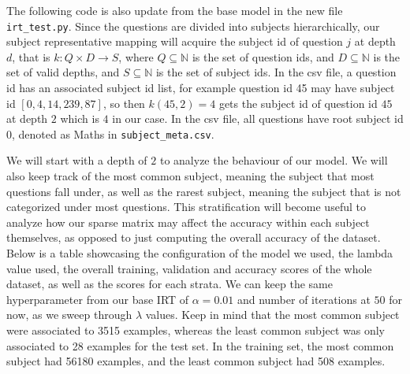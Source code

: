 \documentclass[11pt]{article}
\begin{document}
The following code is also update from the base model in the new file \verb|irt_test.py|. Since the questions are divided into subjects hierarchically, our subject representative mapping will acquire the subject id of question $j$ at depth $d$, that is $k:Q \times D \to S$, where $Q \subseteq \mathbb{N}$ is the set of question ids, and $D \subseteq \mathbb{N}$ is the set of valid depths, and $S \subseteq \mathbb{N}$ is the set of subject ids. In the csv file, a question id has an associated subject id list, for example question id 45 may have subject id $[0, 4, 14, 239, 87]$, so then $k(45, 2) = 4$ gets the subject id of question id $45$ at depth $2$ which is $4$ in our case. In the csv file, all questions have root subject id $0$, denoted as Maths in \verb|subject_meta.csv|. 

We will start with a depth of $2$ to analyze the behaviour of our model. We will also keep track of the most common subject, meaning the subject that most questions fall under, as well as the rarest subject, meaning the subject that is not categorized under most questions. This stratification will become useful to analyze how our sparse matrix may affect the accuracy within each subject themselves, as opposed to just computing the overall accuracy of the dataset. Below is a table showcasing the configuration of the model we used, the lambda value used, the overall training, validation and accuracy scores of the whole dataset, as well as the scores for each strata. We can keep the same hyperparameter from our base IRT of $\alpha = 0.01$ and number of iterations at $50$ for now, as we sweep through $\lambda$ values. Keep in mind that the most common subject were associated to 3515 examples, whereas the least common subject was only associated to 28 examples for the test set. In the training set, the most common subject had 56180 examples, and the least common subject had 508 examples.
\end{document}
